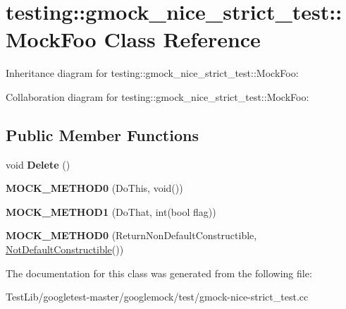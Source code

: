 \hypertarget{classtesting_1_1gmock__nice__strict__test_1_1MockFoo}{}\section{testing\+:\+:gmock\+\_\+nice\+\_\+strict\+\_\+test\+:\+:Mock\+Foo Class Reference}
\label{classtesting_1_1gmock__nice__strict__test_1_1MockFoo}


Inheritance diagram for testing\+:\+:gmock\+\_\+nice\+\_\+strict\+\_\+test\+:\+:Mock\+Foo\+:


Collaboration diagram for testing\+:\+:gmock\+\_\+nice\+\_\+strict\+\_\+test\+:\+:Mock\+Foo\+:
\subsection*{Public Member Functions}
\begin{DoxyCompactItemize}
\item 
\mbox{\label{classtesting_1_1gmock__nice__strict__test_1_1MockFoo_a7bdec6a6353e4396d551dbf8f2beac54}} 
void {\bfseries Delete} ()
\item 
\mbox{\label{classtesting_1_1gmock__nice__strict__test_1_1MockFoo_a14ee661ebc461096824e876a9308840e}} 
{\bfseries M\+O\+C\+K\+\_\+\+M\+E\+T\+H\+O\+D0} (Do\+This, void())
\item 
\mbox{\label{classtesting_1_1gmock__nice__strict__test_1_1MockFoo_a3a7bfcf303a2c8578db900c9525b02a1}} 
{\bfseries M\+O\+C\+K\+\_\+\+M\+E\+T\+H\+O\+D1} (Do\+That, int(bool flag))
\item 
\mbox{\label{classtesting_1_1gmock__nice__strict__test_1_1MockFoo_a2d69a27a8789f04938cb1eb0047bb677}} 
{\bfseries M\+O\+C\+K\+\_\+\+M\+E\+T\+H\+O\+D0} (Return\+Non\+Default\+Constructible, \hyperlink{classtesting_1_1gmock__nice__strict__test_1_1NotDefaultConstructible}{Not\+Default\+Constructible}())
\end{DoxyCompactItemize}


The documentation for this class was generated from the following file\+:\begin{DoxyCompactItemize}
\item 
Test\+Lib/googletest-\/master/googlemock/test/gmock-\/nice-\/strict\+\_\+test.\+cc\end{DoxyCompactItemize}
